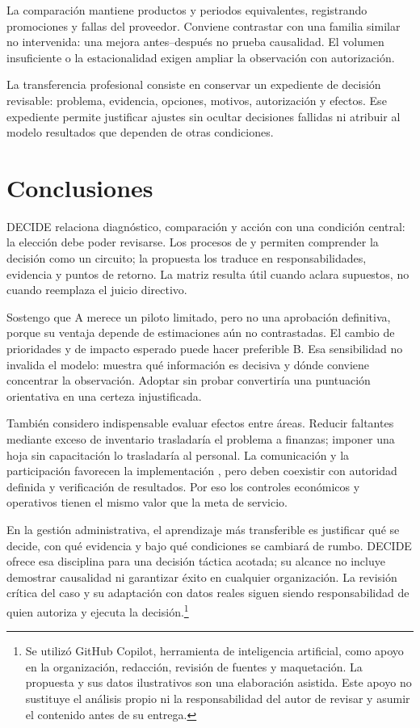 \documentclass[12pt,spanish,letterpaper,oneside]{article}
\begin{document}
La comparación mantiene productos y periodos equivalentes, registrando promociones
y fallas del proveedor. Conviene contrastar con una familia similar no intervenida:
una mejora antes--después no prueba causalidad. El volumen insuficiente o la
estacionalidad exigen ampliar la observación con autorización.

La transferencia profesional consiste en conservar un expediente de decisión
revisable: problema, evidencia, opciones, motivos, autorización y efectos.
Ese expediente permite justificar ajustes sin ocultar decisiones fallidas ni
atribuir al modelo resultados que dependen de otras condiciones.

\clearpage
\section{Conclusiones}
DECIDE relaciona diagnóstico, comparación y acción con una condición central:
la elección debe poder revisarse. Los procesos de \citet{canos} y
\citet{solano2003} permiten comprender la decisión como un circuito; la propuesta
los traduce en responsabilidades, evidencia y puntos de retorno. La matriz
resulta útil cuando aclara supuestos, no cuando reemplaza el juicio directivo.

Sostengo que A merece un piloto limitado, pero no una aprobación definitiva,
porque su ventaja depende de estimaciones aún no contrastadas. El cambio de
prioridades y de impacto esperado puede hacer preferible B. Esa sensibilidad
no invalida el modelo: muestra qué información es decisiva y dónde conviene
concentrar la observación. Adoptar sin probar convertiría una puntuación
orientativa en una certeza injustificada.

También considero indispensable evaluar efectos entre áreas. Reducir faltantes
mediante exceso de inventario trasladaría el problema a finanzas; imponer una
hoja sin capacitación lo trasladaría al personal. La comunicación y la
participación favorecen la implementación \citep{soto2020}, pero deben coexistir
con autoridad definida y verificación de resultados. Por eso los controles
económicos y operativos tienen el mismo valor que la meta de servicio.

En la gestión administrativa, el aprendizaje más transferible es justificar
qué se decide, con qué evidencia y bajo qué condiciones se cambiará de rumbo.
DECIDE ofrece esa disciplina para una decisión táctica acotada; su alcance no
incluye demostrar causalidad ni garantizar éxito en cualquier organización.
La revisión crítica del caso y su adaptación con datos reales siguen siendo
responsabilidad de quien autoriza y ejecuta la decisión.\footnote{Se utilizó
GitHub Copilot, herramienta de inteligencia artificial, como apoyo en la
organización, redacción, revisión de fuentes y maquetación. La propuesta y sus
datos ilustrativos son una elaboración asistida. Este apoyo no sustituye el
análisis propio ni la responsabilidad del autor de revisar y asumir el contenido
antes de su entrega.}

\clearpage
\printbibliography[heading=bibintoc,title={Fuentes de consulta}]
\end{document}
